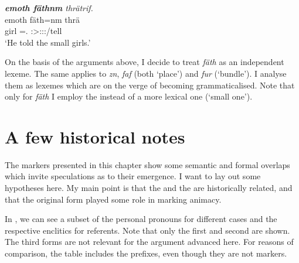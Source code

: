 \begin{exe}
	\ex \emph{\textbf{emoth fäthnm} thrätrif.}\\
	\gll emoth fäth=nm thrä\\
	girl \Dim=\Dat.{\Nsg} \Stsg:\Sbj>\Stpl:\Io:\Rpst:\Pfv/tell\\
	\trans `He told the small girls.'
	\label{ex493}
\end{exe}

On the basis of the arguments above, I decide to treat \emph{fäth} as an independent lexeme. The same applies to \emph{zn}, \emph{faf} (both `place') and \emph{fur} (`bundle'). I analyse them as lexemes which are on the verge of becoming grammaticalised. Note that only for \emph{fäth} I employ the  \Dim{} instead of a more lexical one (`small one').

\section{A few historical notes}\label{casenotes}

The  markers presented in this chapter show some semantic and formal overlaps which invite speculations as to their emergence. I want to lay out some hypotheses here. My main point is that the  and the  are historically related, and that the original form played some role in marking animacy.

In , we can see a subset of the personal pronouns for different cases and the respective  enclitics for  referents. Note that only the first and second  are shown. The third  forms are not relevant for the argument advanced here. For reasons of comparison, the table includes the  prefixes, even though they are not  markers.

